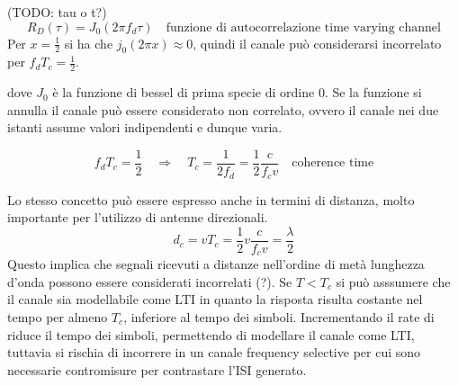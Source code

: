 (TODO: tau o t?)
\[
    R_D (\tau) = J_0(2\pi f_d \tau) \quad \text{funzione di autocorrelazione time varying channel}
\]
Per $x=\frac{1}{2}$ si ha che $j_0(2\pi x) \approx 0$, quindi il canale può considerarsi incorrelato per $f_d T_c = \frac{1}{2}$.

dove $J_0$ è la funzione di bessel di prima specie di ordine 0.  Se la funzione si annulla il canale può essere considerato non correlato, ovvero il canale nei due istanti assume valori indipendenti e dunque varia.

\[
    f_d T_c = \frac{1}{2} \quad \Rightarrow \quad  T_c = \frac{1}{2 f_d} = \frac{1}{2} \frac{c}{f_c v} \quad \text{coherence time}
\]

Lo stesso concetto può essere espresso anche in termini di distanza, molto importante per l'utilizzo di antenne direzionali.
\[
    d_c = v T_c = \frac{1}{2} v \frac{c}{f_c v} = \frac{\lambda}{2}
\]
Questo implica che segnali ricevuti a distanze nell'ordine di metà lunghezza d'onda possono essere considerati incorrelati (?).
Se $T < T_c$ si può asssumere che il canale sia modellabile come LTI in quanto la risposta risulta costante nel tempo per almeno $T_c$, inferiore al tempo dei simboli.
Incrementando il rate di riduce il tempo dei simboli, permettendo di modellare il canale come LTI, tuttavia si rischia di incorrere in un canale frequency selective per cui sono necessarie contromisure per contrastare l'ISI generato.  




